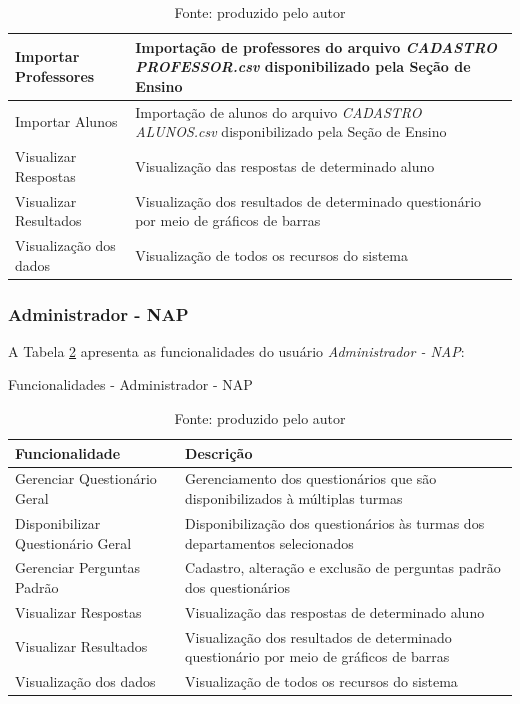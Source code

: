 \documentclass[
  12pt,       %
  openright,      %
  oneside,      %
  a4paper,      %
  english,      %
  french,        %
  spanish,     %
  brazil        %
  ]{abntex2-decsi}
\begin{document}
\begin{table}[h]
\begin{tabular}{p{5cm} p{10cm}}
    \hline
    Importar Professores & Importação de professores do arquivo \textit{CADASTRO PROFESSOR.csv} disponibilizado pela Seção de Ensino \\
    \hline
    Importar Alunos & Importação de alunos do arquivo \textit{CADASTRO ALUNOS.csv} disponibilizado pela Seção de Ensino \\
    \hline
    Visualizar Respostas & Visualização das respostas de determinado aluno\\
    \hline
    Visualizar Resultados & Visualização dos resultados de determinado questionário por meio de gráficos de barras\\
    \hline
    Visualização dos dados & Visualização de todos os recursos do sistema\\
    \hline
    \end{tabular}
    \caption*{Fonte: produzido pelo autor}
    \label{tab:funcoes-admin}
    \end{table}
	
    \newpage
    
    \subsubsection{Administrador - NAP}

    A Tabela \ref{tab:funcoes-admin} apresenta as funcionalidades do usuário \textit{Administrador - NAP}: 

    \begin{table}[h]
    \centering
    \caption{Funcionalidades - Administrador - NAP}
    \begin{tabular}{p{5cm} p{10cm}}
    \hline
    Funcionalidade & Descrição \\
    \hline
    \hline
    Gerenciar Questionário Geral & Gerenciamento dos questionários que são disponibilizados à múltiplas turmas\\
    \hline
    Disponibilizar Questionário Geral & Disponibilização dos questionários às turmas dos departamentos selecionados\\
    \hline
    Gerenciar Perguntas Padrão & Cadastro, alteração e exclusão de perguntas padrão dos questionários\\
    \hline
    Visualizar Respostas & Visualização das respostas de determinado aluno\\
    \hline
    Visualizar Resultados & Visualização dos resultados de determinado questionário por meio de gráficos de barras\\
    \hline
    Visualização dos dados & Visualização de todos os recursos do sistema\\
    \hline
    \end{tabular}
    \caption*{Fonte: produzido pelo autor}
    \label{tab:funcoes-admin}
    \end{table}
\end{document}
